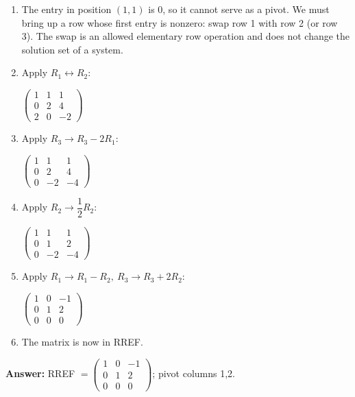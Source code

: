 \documentclass[11pt]{article}
\begin{document}
\begin{tcolorbox}[breakable,colback=ans,colframe=ansb,boxrule=0.5pt,left=4pt,right=4pt,top=2pt,bottom=2pt]\begin{enumerate}[leftmargin=2.2em,itemsep=1pt,topsep=1pt,label=\textbf{Step \arabic*.}]\item The entry in position $(1,1)$ is $0$, so it cannot serve as a pivot. We must bring up a row whose first entry is nonzero: swap row 1 with row 2 (or row 3). The swap is an allowed elementary row operation and does not change the solution set of a system.
\item Apply $R_1\leftrightarrow R_2$:\par\smallskip $\displaystyle \begin{pmatrix}1 & 1 & 1 \\ 0 & 2 & 4 \\ 2 & 0 & -2\end{pmatrix}$
\item Apply $R_3\to R_3-2R_1$:\par\smallskip $\displaystyle \begin{pmatrix}1 & 1 & 1 \\ 0 & 2 & 4 \\ 0 & -2 & -4\end{pmatrix}$
\item Apply $R_2\to \dfrac{1}{2} R_2$:\par\smallskip $\displaystyle \begin{pmatrix}1 & 1 & 1 \\ 0 & 1 & 2 \\ 0 & -2 & -4\end{pmatrix}$
\item Apply $R_1\to R_1-R_2,\ R_3\to R_3+2R_2$:\par\smallskip $\displaystyle \begin{pmatrix}1 & 0 & -1 \\ 0 & 1 & 2 \\ 0 & 0 & 0\end{pmatrix}$
\item The matrix is now in RREF.
\end{enumerate}\textbf{Answer:} RREF $=\begin{pmatrix}1 & 0 & -1 \\ 0 & 1 & 2 \\ 0 & 0 & 0\end{pmatrix}$; pivot columns 1,2.\end{tcolorbox}
\par\vspace{2pt}
\end{document}
